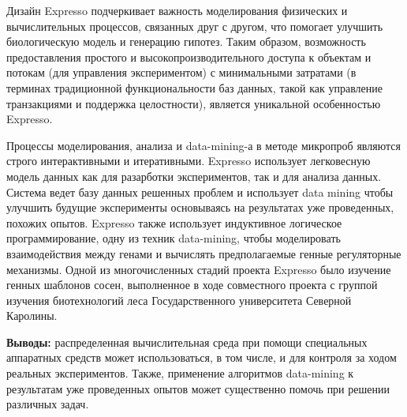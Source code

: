 Дизайн Expresso подчеркивает важность моделирования физических и вычислительных процессов, связанных друг с другом, что помогает улучшить биологическую модель и генерацию гипотез. Таким образом, возможность предоставления простого и высокопроизводительного доступа к объектам и потокам (для управления экспериментом) с минимальными затратами (в терминах традиционной функциональности баз данных, такой как управление транзакциями и поддержка целостности), является уникальной особенностью Expresso.

Процессы моделирования, анализа и data-mining-а в методе микропроб являются строго интерактивными и итеративными. Expresso использует легковесную модель данных как для разарботки экспериментов, так и для анализа данных. Система ведет базу данных решенных проблем и использует data mining чтобы улучшить будущие эксперименты основываясь на результатах уже проведенных, похожих опытов. Expresso также использует индуктивное логическое программирование, одну из техник data-mining, чтобы моделировать взаимодействия между генами и вычислять предполагаемые генные регуляторные механизмы. Одной из многочисленных стадий проекта Expresso было изучение генных шаблонов сосен, выполненное в ходе совместного проекта с группой изучения биотехнологий леса Государственного университета Северной Каролины.
  
\textbf{Выводы:} распределенная вычислительная среда при помощи специальных аппаратных средств может использоваться, в том числе, и для контроля за ходом реальных экспериментов. Также, применение алгоритмов data-mining к результатам уже проведенных опытов может существенно помочь при решении различных задач.
